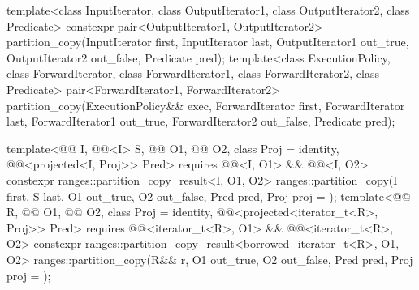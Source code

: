 %
\begin{itemdecl}
template<class InputIterator, class OutputIterator1,
         class OutputIterator2, class Predicate>
  constexpr pair<OutputIterator1, OutputIterator2>
    partition_copy(InputIterator first, InputIterator last,
                   OutputIterator1 out_true, OutputIterator2 out_false, Predicate pred);
template<class ExecutionPolicy, class ForwardIterator, class ForwardIterator1,
         class ForwardIterator2, class Predicate>
  pair<ForwardIterator1, ForwardIterator2>
    partition_copy(ExecutionPolicy&& exec,
                   ForwardIterator first, ForwardIterator last,
                   ForwardIterator1 out_true, ForwardIterator2 out_false, Predicate pred);

template<@@ I, @@<I> S, @@ O1, @@ O2,
         class Proj = identity, @@<projected<I, Proj>> Pred>
  requires @@<I, O1> && @@<I, O2>
  constexpr ranges::partition_copy_result<I, O1, O2>
    ranges::partition_copy(I first, S last, O1 out_true, O2 out_false, Pred pred,
                           Proj proj = {});
template<@@ R, @@ O1, @@ O2,
         class Proj = identity,
         @@<projected<iterator_t<R>, Proj>> Pred>
  requires @@<iterator_t<R>, O1> &&
           @@<iterator_t<R>, O2>
  constexpr ranges::partition_copy_result<borrowed_iterator_t<R>, O1, O2>
    ranges::partition_copy(R&& r, O1 out_true, O2 out_false, Pred pred, Proj proj = {});
\end{itemdecl}

